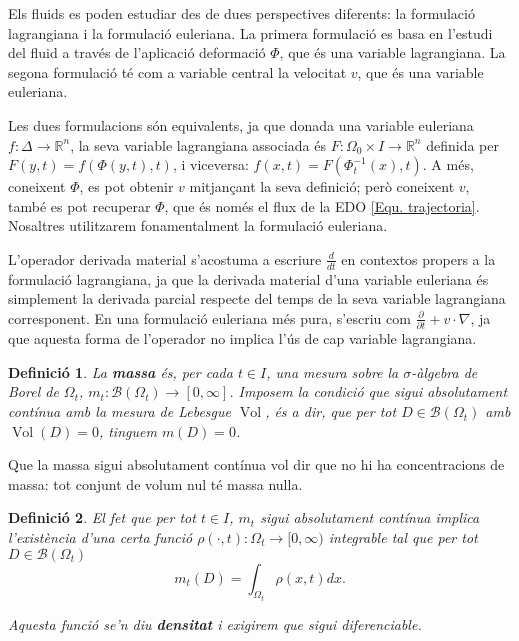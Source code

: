 \documentclass{article}
\numberwithin{equation}{section}
\DeclareMathOperator{\Vol}{Vol}
\newtheorem{definicio}{Definici\'{o}}[section]
\begin{document}
Els fluids es poden estudiar des de dues perspectives diferents: la formulaci\'{o} lagrangiana i la formulaci\'{o} euleriana. La primera formulaci\'{o} es basa en l'estudi del fluid a trav\'{e}s de l'aplicaci\'{o} deformaci\'{o} $\Phi$, que \'{e}s una variable lagrangiana. La segona formulaci\'{o} t\'{e} com a variable central la velocitat $v$, que \'{e}s una variable euleriana.

Les dues formulacions s\'{o}n equivalents, ja que donada una variable euleriana $f:\Delta\rightarrow\mathbb{R}^n$, la seva variable lagrangiana associada \'{e}s $F:\Omega_0\times I\rightarrow\mathbb{R}^n$ definida per $F(y,t)=f(\Phi(y,t),t)$, i viceversa: $f(x,t)=F(\Phi_t^{-1}(x),t)$. A m\'{e}s, coneixent $\Phi$, es pot obtenir $v$ mitjan\c{c}ant la seva definici\'{o}; per\`{o} coneixent $v$, tamb\'{e} es pot recuperar $\Phi$, que \'{e}s nom\'{e}s el flux de la EDO \ref{Equ. trajectoria}. Nosaltres utilitzarem fonamentalment la formulaci\'{o} euleriana.

L'operador derivada material s'acostuma a escriure $\frac{d}{dt}$ en contextos propers a la formulaci\'{o} lagrangiana, ja que la derivada material d'una variable euleriana \'{e}s simplement la derivada parcial respecte del temps de la seva variable lagrangiana corresponent. En una formulaci\'{o} euleriana m\'{e}s pura, s'escriu com $\frac{\partial}{\partial t}+v\cdot\nabla$, ja que aquesta forma de l'operador no implica l'\'{u}s de cap variable lagrangiana.

\begin{definicio}
La \textbf{massa} \'{e}s, per cada $t\in I$, una mesura sobre la $\sigma$-\`{a}lgebra de Borel de $\Omega_t$, $m_t:\mathcal{B}(\Omega_t)\rightarrow[0,\infty]$. Imposem la condici\'{o} que sigui absolutament cont\'{i}nua amb la mesura de Lebesgue $\Vol$, \'{e}s a dir, que per tot $D\in\mathcal{B}(\Omega_t)$ amb $\Vol(D)=0$, tinguem $m(D)=0$.
\end{definicio}

Que la massa sigui absolutament cont\'{i}nua vol dir que no hi ha concentracions de massa: tot conjunt de volum nul t\'{e} massa nul\textperiodcentered la.

\begin{definicio}
El fet que per tot $t\in I$, $m_t$ sigui absolutament cont\'{i}nua implica l'exist\`{e}ncia d'una certa funci\'{o} $\rho(\cdot,t):\Omega_t\rightarrow[0,\infty)$ integrable tal que per tot $D\in\mathcal{B}(\Omega_t)$
\[m_t(D)=\int_{\Omega_t}\rho(x,t)dx.\]

Aquesta funci\'{o} se'n diu \textbf{densitat} i exigirem que sigui diferenciable.
\end{definicio}
\end{document}
